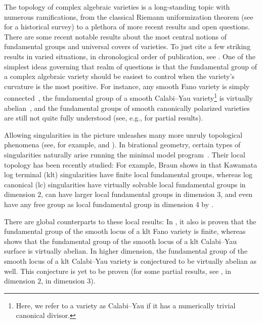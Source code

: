 \documentclass{amsart}
\theoremstyle{definition}
\theoremstyle{remark}
\numberwithin{equation}{section}
\begin{document}
The topology of complex algebraic varieties is a long-standing topic with numerous ramifications, from the classical Riemann uniformization theorem (see \cite{dSG16} for a historical survey) to a plethora of more recent results and open questions. There are some recent notable results about the most central notions of fundamental groups and universal covers of varieties. To just cite a few striking results in varied situations, in chronological order of publication, see \cite{Ara91,Cam93,Kol93,Tol93,Ara95,Cam95,CT95,Kol95,CT97,ABCKT96,AN99,CKO03,CF03,Cam04,DPS09,Cam11bis,BCGP12,CHK13,CC14,ADH16,CC16,GKP16,Ara17,Cat17,Bra20,AFPRW22,CGGN22,CGG23}.
One of the simplest ideas governing that realm of questions is that the fundamental group of a complex algebraic variety should be easiest to control when the variety's curvature is the most positive.
For instance, any smooth Fano variety is simply connected~\cite{Kob61,Cam91,KMM92}, the fundamental group of a smooth Calabi--Yau variety\footnote{Here, we refer to a variety as Calabi--Yau if it has a numerically trivial canonical divisor.} is virtually abelian~\cite{Gro78,Bea83}, and the fundamental groups of smooth canonically polarized varieties are still not quite fully understood (see, e.g., \cite{Ara95} for partial results).

Allowing singularities in the picture unleashes many more unruly topological phenomena (see, for example, \cite[Theorem 12.1]{Sim11} and \cite[Theorems 1 and 2]{KK14}). In birational geometry, certain types of singularities naturally arise running the minimal model program~\cite[Definition 2.34]{KM98}. Their local topology has been recently studied: For example, Braun shows in \cite{Bra20} that Kawamata log terminal (klt) singularities have finite local fundamental groups, whereas log canonical (lc) singularities have virtually solvable local fundamental groups in dimension $2$, can have larger local fundamental groups in dimension $3$, and even have any free group as local fundamental group in dimension 4 by \cite{FM23}.

There are global counterparts to these local results: In \cite{Bra20}, it also is proven that the fundamental group of the smooth locus of a klt Fano variety is finite, whereas \cite{CC14} shows that the fundamental group of the smooth locus of a klt Calabi--Yau surface is virtually abelian. In higher dimension, the fundamental group of the smooth locus of a klt Calabi--Yau variety is conjectured to be virtually abelian as well. This conjecture is yet to be proven (for some partial results, see \cite{GGK19,Dru18,HP19,Cam21}, \cite{CC14} in dimension $2$, \cite{BF24} in dimension $3$).
\end{document}
